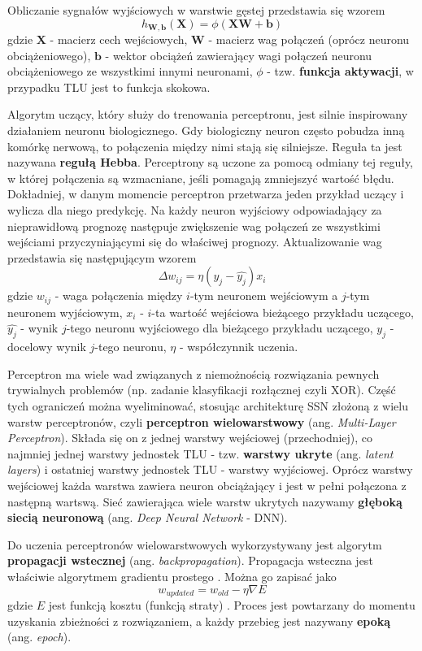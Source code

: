\documentclass[12pt]{mwbk}
\theoremstyle{plain}
\theoremstyle{definition}
\theoremstyle{remark}
\begin{document}
Obliczanie sygnałów wyjściowych w warstwie gęstej przedstawia się wzorem
$$h_{\mathbf{W},\mathbf{b}}(\mathbf{X})=\phi(\mathbf{XW}+\mathbf{b})$$
gdzie $\mathbf{X}$ - macierz cech wejściowych, $\mathbf{W}$ - macierz wag połączeń (oprócz neuronu obciążeniowego), $\mathbf{b}$ - wektor obciążeń zawierający wagi połączeń neuronu obciążeniowego ze wszystkimi innymi neuronami, $\phi$ - tzw. \textbf{funkcja aktywacji}, w przypadku TLU jest to funkcja skokowa.

Algorytm uczący, który służy do trenowania perceptronu, jest silnie inspirowany działaniem neuronu biologicznego. Gdy biologiczny neuron często pobudza inną komórkę nerwową, to połączenia między nimi stają się silniejsze. Reguła ta jest nazywana \textbf{regułą Hebba}. Perceptrony są uczone za pomocą odmiany tej reguły, w której połączenia są wzmacniane, jeśli pomagają zmniejszyć wartość błędu. Dokładniej, w danym momencie perceptron przetwarza jeden przykład uczący i wylicza dla niego predykcję. Na każdy neuron wyjściowy odpowiadający za nieprawidłową prognozę następuje zwiększenie wag połączeń ze wszystkimi wejściami przyczyniającymi się do właściwej prognozy. Aktualizowanie wag przedstawia się następującym wzorem
$$\Delta w_{ij}=\eta (y_j-\hat{y_j})x_i$$
gdzie $w_{ij}$ - waga połączenia między $i$-tym neuronem wejściowym a $j$-tym neuronem wyjściowym, $x_i$ - $i$-ta wartość wejściowa bieżącego przykładu uczącego, $\hat{y_j}$ - wynik $j$-tego neuronu wyjściowego dla bieżącego przykładu uczącego, $y_j$ - docelowy wynik $j$-tego neuronu, $\eta$ - współczynnik uczenia.

Perceptron ma wiele wad związanych z niemożnością rozwiązania pewnych trywialnych problemów (np. zadanie klasyfikacji rozłącznej czyli XOR). Część tych ograniczeń można wyeliminować, stosując architekturę SSN złożoną z wielu warstw perceptronów, czyli \textbf{perceptron wielowarstwowy} (ang. \emph{Multi-Layer Perceptron}). Składa się on z jednej warstwy wejściowej (przechodniej), co najmniej jednej warstwy jednostek TLU - tzw. \textbf{warstwy ukryte} (ang. \emph{latent layers}) i ostatniej warstwy jednostek TLU - warstwy wyjściowej. Oprócz warstwy wejściowej każda warstwa zawiera neuron obciążający i jest w pełni połączona z następną wartswą. Sieć zawierająca wiele warstw ukrytych nazywamy \textbf{głęboką siecią neuronową} (ang. \emph{Deep Neural Network} - DNN). 

Do uczenia perceptronów wielowarstwowych wykorzystywany jest algorytm \textbf{propagacji wstecznej} (ang. \emph{backpropagation}). Propagacja wsteczna jest właściwie algorytmem gradientu prostego \cite{skansi}. Można go zapisać jako
$$w_{updated}=w_{old}-\eta \nabla E$$
gdzie $E$ jest funkcją kosztu (funkcją straty) \cite{skansi}. Proces jest powtarzany do momentu uzyskania zbieżności z rozwiązaniem, a każdy przebieg jest nazywany \textbf{epoką} (ang. \emph{epoch}).
\end{document}
